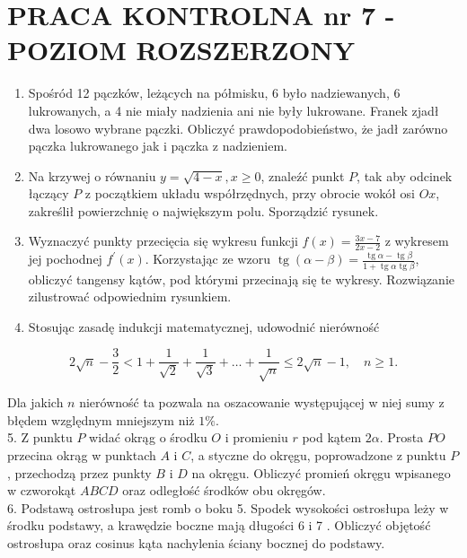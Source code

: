 \documentclass[10pt]{article}
\begin{document}
\section*{PRACA KONTROLNA nr 7 -POZIOM ROZSZERZONY}
\begin{enumerate}
  \item Spośród 12 pączków, leżących na półmisku, 6 było nadziewanych, 6 lukrowanych, a 4 nie miały nadzienia ani nie były lukrowane. Franek zjadł dwa losowo wybrane pączki. Obliczyć prawdopodobieństwo, że jadł zarówno pączka lukrowanego jak i pączka z nadzieniem.
  \item Na krzywej o równaniu $y=\sqrt{4-x}, x \geqslant 0$, znaleźć punkt $P$, tak aby odcinek łączący $P$ z początkiem układu współrzędnych, przy obrocie wokół osi $O x$, zakreślił powierzchnię o największym polu. Sporządzić rysunek.
  \item Wyznaczyć punkty przecięcia się wykresu funkcji $f(x)=\frac{3 x-7}{2 x-2}$ z wykresem jej pochodnej $f^{\prime}(x)$. Korzystając ze wzoru $\operatorname{tg}(\alpha-\beta)=\frac{\operatorname{tg} \alpha-\operatorname{tg} \beta}{1+\operatorname{tg} \alpha \operatorname{tg} \beta}$, obliczyć tangensy kątów, pod którymi przecinają się te wykresy. Rozwiązanie zilustrować odpowiednim rysunkiem.
  \item Stosując zasadę indukcji matematycznej, udowodnić nierówność
\end{enumerate}

$$
2 \sqrt{n}-\frac{3}{2}<1+\frac{1}{\sqrt{2}}+\frac{1}{\sqrt{3}}+\ldots+\frac{1}{\sqrt{n}} \leqslant 2 \sqrt{n}-1, \quad n \geqslant 1 .
$$

Dla jakich $n$ nierówność ta pozwala na oszacowanie występującej w niej sumy z błędem względnym mniejszym niż $1 \%$.\\
5. Z punktu $P$ widać okrąg o środku $O$ i promieniu $r$ pod kątem $2 \alpha$. Prosta $P O$ przecina okrąg w punktach $A$ i $C$, a styczne do okręgu, poprowadzone z punktu $P$, przechodzą przez punkty $B$ i $D$ na okręgu. Obliczyć promień okręgu wpisanego w czworokąt $A B C D$ oraz odległość środków obu okręgów.\\
6. Podstawą ostrosłupa jest romb o boku 5. Spodek wysokości ostrosłupa leży w środku podstawy, a krawędzie boczne mają długości 6 i 7 . Obliczyć objętość ostrosłupa oraz cosinus kąta nachylenia ściany bocznej do podstawy.
\end{document}
